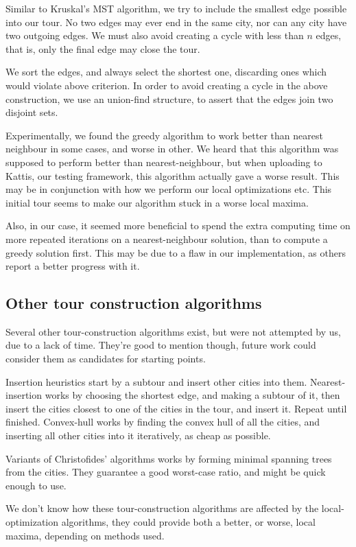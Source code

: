 \documentclass[a4paper,12pt,oneside]{article}
\begin{document}
Similar to Kruskal's MST algorithm, we try to include the smallest edge possible into our tour. No two edges may ever end in the same city, nor can any city have two outgoing edges. We must also avoid creating a cycle with less than $n$ edges, that is, only the final edge may close the tour.

We sort the edges, and always select the shortest one, discarding ones which would violate above criterion. In order to avoid creating a cycle in the above construction, we use an union-find structure, to assert that the edges join two disjoint sets.

Experimentally, we found the greedy algorithm to work better than nearest neighbour in some cases, and worse in other. We heard that this algorithm was supposed to perform better than nearest-neighbour, but when uploading to Kattis, our testing framework, this algorithm actually gave a worse result. This may be in conjunction with how we perform our local optimizations etc. This initial tour seems to make our algorithm stuck in a worse local maxima.

Also, in our case, it seemed more beneficial to spend the extra computing time on more repeated iterations on a nearest-neighbour solution, than to compute a greedy solution first. This may be due to a flaw in our implementation, as others report a better progress with it.

\subsection{Other tour construction algorithms}

Several other tour-construction algorithms exist, but were not attempted by us, due to a lack of time. They're good to mention though, future work could consider them as candidates for starting points.

Insertion heuristics start by a subtour and insert other cities into them. Nearest-insertion works by choosing the shortest edge, and making a subtour of it, then insert the cities closest to one of the cities in the tour, and insert it. Repeat until finished. Convex-hull works by finding the convex hull of all the cities, and inserting all other cities into it iteratively, as cheap as possible.

Variants of Christofides' algorithms works by forming minimal spanning trees from the cities. They guarantee a good worst-case ratio, and might be quick enough to use.

We don't know how these tour-construction algorithms are affected by the local-optimization algorithms, they could provide both a better, or worse, local maxima, depending on methods used.
\end{document}
